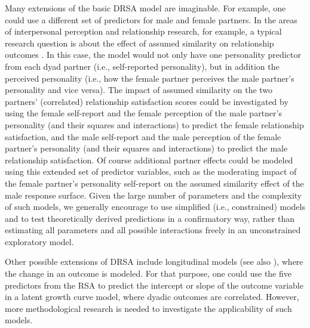 \documentclass[jou,a4paper,draftfirst]{apa6}
\newcommand{\added}[1]{#1}
\begin{document}
\added{Many extensions of the basic DRSA model are imaginable. For example, one could use a different set of predictors for male and female partners. In the areas of interpersonal perception and relationship research, for example, a typical research question is about the effect of assumed similarity on relationship outcomes \parencite{Back_Vazire_2015}. In this case, the model would not only have one personality predictor from each dyad partner (i.e., self-reported personality), but in addition the perceived personality (i.e., how the female partner perceives the male partner's personality and vice versa). The impact of assumed similarity on the two partners' (correlated) relationship satisfaction scores could be investigated by using the female self-report and the female perception of the male partner's personality (and their squares and interactions) to predict the female relationship satisfaction, and the male self-report and the male perception of the female partner's personality (and their squares and interactions) to predict the male relationship satisfaction. Of course additional partner effects could be modeled using this extended set of predictor variables, such as the moderating impact of the female partner's personality self-report on the assumed similarity effect of the male response surface. Given the large number of parameters and the complexity of such models, we generally encourage to use simplified (i.e., constrained) models and to test theoretically derived predictions in a confirmatory way, rather than estimating all parameters and all possible interactions freely in an unconstrained exploratory model.}

\added{Other possible extensions of DRSA include longitudinal models (see also \nptextcite{NestlerEtAl2015}), where the change in an outcome is modeled. For that purpose, one could use the five predictors from the RSA to predict the intercept or slope of the outcome variable in a latent growth curve model, where dyadic outcomes are correlated. However, more methodological research is needed to investigate the applicability of such models.}
\end{document}
